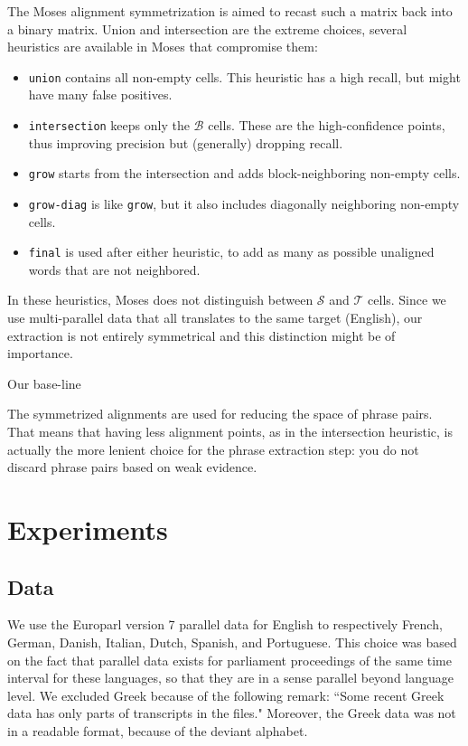 \documentclass[11pt]{article}
\begin{document}
The Moses alignment symmetrization is aimed to recast such a matrix back into a binary matrix. Union and intersection are the extreme choices, several  heuristics are available in Moses that compromise them:\begin{itemize}
\item {\tt union} contains all non-empty cells. This heuristic has a high recall, but might have many false positives.
\item  {\tt intersection} keeps only the $\mathcal B$ cells. These are the high-confidence points, thus improving precision but (generally) dropping recall.
\item {\tt grow} starts from the intersection and adds block-neighboring non-empty cells.
\item {\tt grow-diag} is like {\tt grow}, but it also includes diagonally neighboring non-empty cells.
\item {\tt final} is used after either heuristic, to add as many as possible unaligned words that are not neighbored.  %
\end{itemize}

In these heuristics, Moses does not distinguish between $\mathcal S$ and $\mathcal T$ cells. Since we use multi-parallel data that all translates to the same target (English), our extraction is not entirely symmetrical and this distinction might be of importance. 

Our base-line 

The symmetrized alignments are used for reducing the space of phrase pairs. That means that having less alignment points, as in the intersection heuristic, is actually the more lenient choice for the phrase extraction step: you do not discard phrase pairs based on weak evidence. 



\section{Experiments}

\subsection{Data}

We use the Europarl version 7 parallel data for English to respectively French, German, Danish, Italian, Dutch, Spanish, and Portuguese. This choice was based on the fact that parallel data exists for parliament proceedings of the same time interval for these languages, so that they are in a sense parallel beyond language level.
We excluded Greek because of the following remark: ``Some recent Greek data has only parts of transcripts in the files." Moreover, the Greek data was not in a readable format, because of the deviant alphabet.
\end{document}
